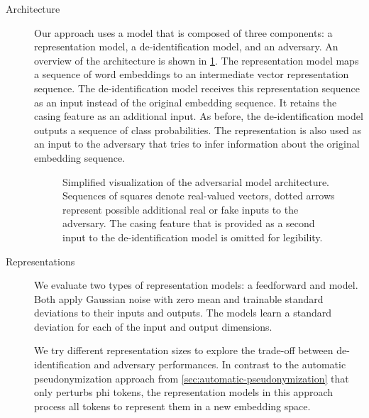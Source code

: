\begin{description}
    \item[Architecture]
    Our approach uses a model that is composed of three components: a representation model, a de-identification model, and an adversary.
    An overview of the architecture is shown in \cref{fig:adversarial-model}.
    The representation model maps a sequence of word embeddings to an intermediate vector representation sequence.
    The de-identification model receives this representation sequence as an input instead of the original embedding sequence.
    It retains the casing feature as an additional input.
    As before, the de-identification model outputs a sequence of class probabilities.
    The representation is also used as an input to the adversary that tries to infer information about the original embedding sequence.
    
    \begin{figure}
        \centering
        
        \caption[Adversarial model architecture]{%
            Simplified visualization of the adversarial model architecture.
            Sequences of squares denote real-valued vectors, dotted arrows represent possible additional real or fake inputs to the adversary.
            The casing feature that is provided as a second input to the de-identification model is omitted for legibility.}\label{fig:adversarial-model}
    \end{figure}
    
    \item[Representations]
    We evaluate two types of representation models: a feedforward and  model.
    Both apply Gaussian noise with zero mean and trainable standard deviations to their inputs and outputs.
    The models learn a standard deviation for each of the input and output dimensions.
    
    
    We try different representation sizes to explore the trade-off between de-identification and adversary performances.
    In contrast to the automatic pseudonymization approach from \cref{sec:automatic-pseudonymization} that only perturbs \ac{phi} tokens, the representation models in this approach process all tokens to represent them in a new embedding space.
    

\end{description}
